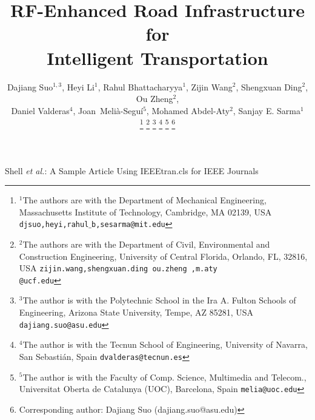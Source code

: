 \documentclass[lettersize,journal]{IEEEtran}
\begin{document}
\title{RF-Enhanced Road Infrastructure for \\ Intelligent Transportation}


\author{Dajiang Suo$^{1,3}$, Heyi Li$^{1}$, Rahul Bhattacharyya$^{1}$, Zijin Wang$^{2}$, Shengxuan Ding$^{2}$, Ou Zheng$^{2}$, \\ Daniel Valderas$^{4}$, Joan~Meli\`{a}-Segu\'{i}$^{5}$, Mohamed Abdel-Aty$^{2}$, Sanjay E. Sarma$^{1}$
        

\thanks{$^{1}$The authors are with the Department of Mechanical Engineering,
        Massachusetts Institute of Technology, Cambridge, MA 02139, USA
        {\tt\small djsuo,heyi,rahul$\_$b,sesarma@mit.edu}}%
\thanks{$^{2}$The authors are with the Department of Civil, Environmental and Construction Engineering,
        University of Central Florida, Orlando, FL, 32816, USA
        {\tt\small zijin.wang,shengxuan.ding ou.zheng ,m.aty\\@ucf.edu}}%
\thanks{$^{3}$The author is with the Polytechnic School in the Ira A. Fulton Schools of Engineering, Arizona State University, Tempe, AZ 85281, USA
        {\tt\small dajiang.suo@asu.edu}}%
\thanks{$^{4}$The author is with the Tecnun School of Engineering, University of Navarra, San Sebastián, Spain
        {\tt\small dvalderas@tecnun.es}}%
\thanks{$^{5}$The author is with the Faculty of Comp. Science, Multimedia and Telecom., Universitat Oberta de Catalunya (UOC), Barcelona, Spain
        {\tt\small melia@uoc.edu}}%
\thanks{Corresponding author: Dajiang Suo (dajiang.suo@asu.edu)}

}

\markboth{}%
{Shell \MakeLowercase{\textit{et al.}}: A Sample Article Using IEEEtran.cls for IEEE Journals}


\maketitle
\end{document}
